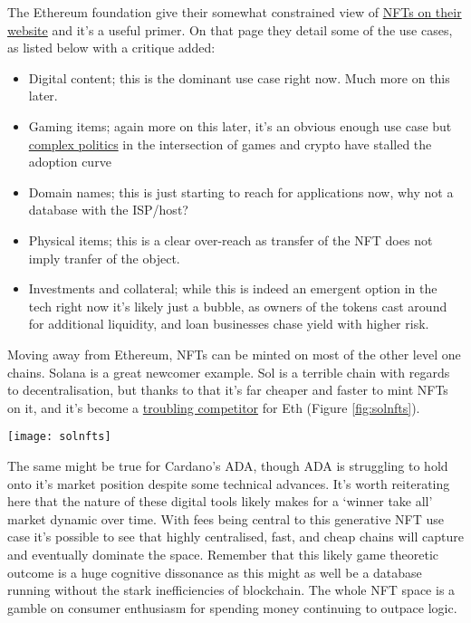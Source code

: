 The Ethereum foundation give their somewhat constrained view of \href{https://ethereum.org/en/nft/}{NFTs on their website} and it's a useful primer. On that page they detail some of the use cases, as listed below with a critique added:
\begin{itemize}
\item Digital content; this is the dominant use case right now. Much more on this later.
\item Gaming items; again more on this later, it's an obvious enough use case but \href{https://climatereplay.org/nfts/nft-digital-ownership-pledge/}{complex politics} in the intersection of games and crypto have stalled the adoption curve
\item Domain names; this is just starting to reach for applications now, why not a database with the ISP/host?
\item Physical items; this is a clear over-reach as transfer of the NFT does not imply tranfer of the object.
\item Investments and collateral; while this is indeed an emergent option in the tech right now it's likely just a bubble, as owners of the tokens cast around for additional liquidity, and loan businesses chase yield with higher risk.
\end{itemize}
Moving away from Ethereum, NFTs can be minted on most of the other level one chains. Solana is a great newcomer example. Sol is a terrible chain with regards to decentralisation, but thanks to that it's far cheaper and faster to mint NFTs on it, and it's become a \href{https://markets.businessinsider.com/news/currencies/ethereum-eth-killers-nfts-defi-solana-cardano-wax-crypto-investing-2022-1}{troubling competitor} for Eth (Figure \ref{fig:solnfts}).\par 
\begin{figure*}[ht]\centering %
	\texttt{[image: solnfts]}
	\caption{Solana NFT markets are enjoying growth compared to Opensea on Ethereum, even in the downturn.}
	\label{fig:solnfts}
\end{figure*}
The same might be true for Cardano's ADA, though ADA is struggling to hold onto it's market position despite some technical advances. It's worth reiterating here that the nature of these digital tools likely makes for a `winner take all' market dynamic over time. With fees being central to this generative NFT use case it's possible to see that highly centralised, fast, and cheap chains will capture and eventually dominate the space. Remember that this likely game theoretic outcome is a huge cognitive dissonance as this might as well be a database running without the stark inefficiencies of blockchain. The whole NFT space is a gamble on consumer enthusiasm for spending money continuing to outpace logic.\par 
